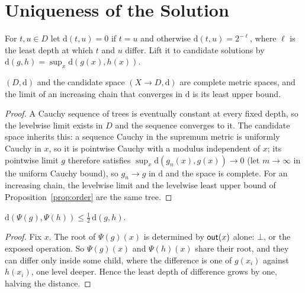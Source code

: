 \section{Uniqueness of the Solution}\label{app:unique}
\begin{definition}\label{def:metric}
  For $t, u \in D$ let $\mathrm{d}(t, u) = 0$ if $t = u$ and otherwise
  $\mathrm{d}(t, u) = 2^{-\ell}$, where $\ell$ is the least depth at which $t$ and $u$
  differ. Lift it to candidate solutions by
  $\mathrm{d}(g, h) = \sup_x \mathrm{d}(g(x), h(x))$.
\end{definition}

\begin{lemma}[Completeness]\label{lem:metric}
  $(D, \mathrm{d})$ and the candidate space $(X \to D, \mathrm{d})$ are complete metric
  spaces, and the limit of an increasing chain that converges in $\mathrm{d}$ is its least
  upper bound.
\end{lemma}
\begin{proof}
  A Cauchy sequence of trees is eventually constant at every fixed depth, so the levelwise
  limit exists in $D$ and the sequence converges to it. The candidate space inherits this:
  a sequence Cauchy in the supremum metric is uniformly Cauchy in $x$, so it is pointwise
  Cauchy with a modulus independent of $x$; its pointwise limit $g$ therefore satisfies
  $\sup_x \mathrm{d}(g_n(x), g(x)) \to 0$ (let $m \to \infty$ in the uniform Cauchy bound),
  so $g_n \to g$ in $\mathrm{d}$ and the space is complete. For an
  increasing chain, the levelwise limit and the levelwise least upper bound of
  Proposition~\ref{prop:order} are the same tree.
\end{proof}

\begin{lemma}[Guardedness]\label{lem:guarded}
  $\mathrm{d}(\Psi(g), \Psi(h)) \le \tfrac{1}{2}\,\mathrm{d}(g, h)$.
\end{lemma}
\begin{proof}
  Fix $x$. The root of $\Psi(g)(x)$ is determined by $\mathsf{out}(x)$ alone: $\bot$, or the exposed
  operation. So $\Psi(g)(x)$ and $\Psi(h)(x)$ share their root, and they can differ only
  inside some child, where the difference is one of $g(x_i)$ against $h(x_i)$, one level
  deeper. Hence the least depth of difference grows by one, halving the distance.
\end{proof}

